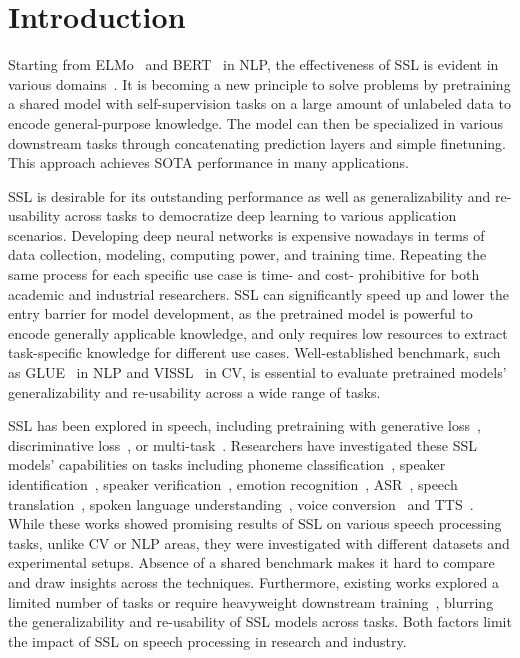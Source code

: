 \documentclass[a4paper]{article}
\begin{document}
\section{Introduction}

Starting from ELMo~\cite{elmo} and BERT~\cite{bert} in NLP, the effectiveness of SSL is evident in various domains~\cite{donotstoppretraining, visual_pretraining}.
It is becoming a new principle to solve problems by pretraining a shared model with self-supervision tasks on a large amount of unlabeled data to encode general-purpose knowledge.
The model can then be specialized in various downstream tasks through concatenating prediction layers and simple finetuning.
This approach achieves SOTA performance in many applications.

SSL is desirable for its outstanding performance as well as generalizability and re-usability across tasks to democratize deep learning to various application scenarios. 
Developing deep neural networks is expensive nowadays in terms of data collection, modeling, computing power, and training time.
Repeating the same process for each specific use case is time- and cost- prohibitive for both academic and industrial researchers.
SSL can significantly speed up and lower the entry barrier for model development, as the pretrained model is powerful to encode generally applicable knowledge, and only requires low resources to extract task-specific knowledge for different use cases.
Well-established benchmark, such as GLUE~\cite{glue} in NLP and VISSL~\cite{vissl} in CV, is essential to evaluate pretrained models' generalizability and re-usability across a wide range of tasks.

SSL has been explored in speech, including pretraining with generative loss~\cite{apc1, mockingjay,tera,decoar2}, discriminative loss~\cite{cpc, wav2vec,vq_wav2vec,wav2vec2}, or multi-task~\cite{pase,pase+}.
Researchers have investigated these SSL models' capabilities on tasks including phoneme classification~\cite{cpc,apc1}, speaker identification~\cite{apc1,mockingjay}, speaker verification~\cite{sv-wav2vec2}, emotion recognition~\cite{pase}, ASR~\cite{tera,wav2vec,decoar2,pase+}, speech translation~\cite{apc1}, spoken language understanding~\cite{lai2020semi}, voice conversion~\cite{lin2020fragmentvc} and TTS~\cite{ssl-for-tts}.
While these works showed promising results of SSL on various speech processing tasks, unlike CV or NLP areas, they were investigated with different datasets and experimental setups.
Absence of a shared benchmark makes it hard to compare and draw insights across the techniques.
Furthermore, existing works explored a limited number of tasks or require heavyweight downstream training~\cite{tera,wav2vec,wav2vec2}, blurring the generalizability and re-usability of SSL models across tasks.
Both factors limit the impact of SSL on speech processing in research and industry.
\end{document}
